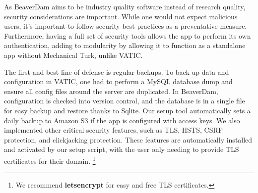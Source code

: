 As BeaverDam aims to be industry quality software instead of research quality, security considerations are important.
While one would not expect malicious users, it's important to follow security best practices as a preventative measure. 
Furthermore, having a full set of security tools allows the app to perform its own authentication, 
adding to modularity by allowing it to function as a standalone app without Mechanical Turk, unlike VATIC.

The first and best line of defense is regular backups.
To back up data and configuration in VATIC, one had to perform a MySQL database dump and ensure all config files around the server are duplicated.
In BeaverDam, configuration is checked into version control, and the database is in a single file for easy backup and restore thanks to Sqlite.
Our setup tool automatically sets a daily backup to Amazon S3 if the app is configured with access keys. 
We also implemented other critical security features, such as TLS, HSTS, CSRF protection, and clickjacking protection. 
These features are automatically installed and activated by our setup script, 
with the user only needing to provide TLS certificates for their domain. \footnote{We recommend \textbf{letsencrypt} for easy and free TLS certificates.} 


